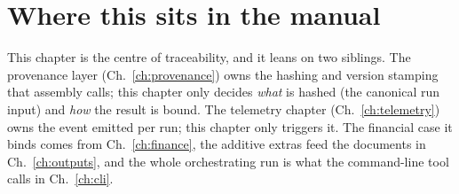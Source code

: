 \section{Where this sits in the manual}

This chapter is the centre of traceability, and it leans on two siblings. The provenance layer (Ch.~\ref{ch:provenance}) owns the hashing and version stamping that assembly calls; this chapter only decides \emph{what} is hashed (the canonical run input) and \emph{how} the result is bound. The telemetry chapter (Ch.~\ref{ch:telemetry}) owns the event emitted per run; this chapter only triggers it. The financial case it binds comes from Ch.~\ref{ch:finance}, the additive extras feed the documents in Ch.~\ref{ch:outputs}, and the whole orchestrating run is what the command-line tool calls in Ch.~\ref{ch:cli}.

